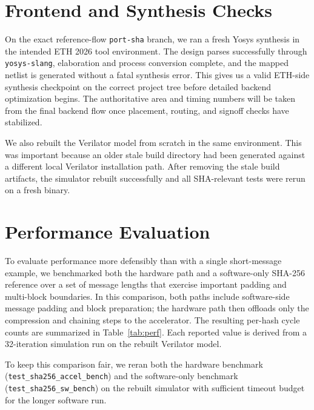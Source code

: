 \documentclass[11pt,a4paper]{article}
\begin{document}
\section{Frontend and Synthesis Checks}
On the exact reference-flow \texttt{port-sha} branch, we ran a fresh Yosys
synthesis in the intended ETH 2026 tool environment. The design parses
successfully through \texttt{yosys-slang}, elaboration and process conversion
complete, and the mapped netlist is generated without a fatal synthesis error.
This gives us a valid ETH-side synthesis checkpoint on the correct project tree
before detailed backend optimization begins. The authoritative area and timing
numbers will be taken from the final backend flow once placement, routing, and
signoff checks have stabilized.

We also rebuilt the Verilator model from scratch in the same environment. This
was important because an older stale build directory had been generated against
a different local Verilator installation path. After removing the stale build
artifacts, the simulator rebuilt successfully and all SHA-relevant tests were
rerun on a fresh binary.

\section{Performance Evaluation}
To evaluate performance more defensibly than with a single short-message
example, we benchmarked both the hardware path and a software-only SHA-256
reference over a set of message lengths that exercise important padding and
multi-block boundaries. In this comparison, both paths include software-side
message padding and block preparation; the hardware path then offloads only the
compression and chaining steps to the accelerator. The resulting per-hash cycle
counts are summarized in Table~\ref{tab:perf}. Each reported value is derived
from a 32-iteration simulation run on the rebuilt Verilator model.

To keep this comparison fair, we reran both the hardware benchmark
(\texttt{test\_sha256\_accel\_bench}) and the software-only benchmark
(\texttt{test\_sha256\_sw\_bench}) on the rebuilt simulator with sufficient
timeout budget for the longer software run.
\end{document}
